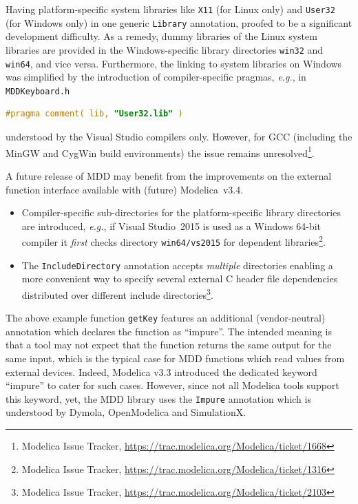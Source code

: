 \documentclass{resources/modelica}
\newcommand{\modelica}[1]{\lstinline[language=modelica]|#1|}
\begin{document}
Having platform-specific system libraries like \modelica{X11} (for Linux only) and \modelica{User32} (for Windows only) in one generic \modelica{Library} annotation, proofed to be a significant development difficulty. As a remedy, dummy libraries of the Linux system libraries are provided in the Windows-specific library directories \modelica{win32} and \modelica{win64}, and vice versa. Furthermore, the linking to system libraries on Windows was simplified by the introduction of compiler-specific pragmas, \textit{e.g.}, in \modelica{MDDKeyboard.h}
\begin{lstlisting}[language=C]
#pragma comment( lib, "User32.lib" )
\end{lstlisting}
understood by the Visual Studio compilers only. However, for GCC (including the MinGW and CygWin build environments) the issue remains unresolved\footnote{Modelica Issue Tracker, \url{https://trac.modelica.org/Modelica/ticket/1668}}.

A future release of MDD may benefit from the improvements on the external function interface available with (future) Modelica~v3.4.
\begin{itemize}
 \item Compiler-specific sub-directories for the platform-specific library directories are introduced, \textit{e.g.}, if Visual Studio~2015 is used as a Windows 64-bit compiler it \emph{first} checks directory \modelica{win64/vs2015} for dependent libraries\footnote{Modelica Issue Tracker, \url{https://trac.modelica.org/Modelica/ticket/1316}}.
 \item The \modelica{IncludeDirectory} annotation accepts \emph{multiple} directories enabling a more convenient way to specify several external C header file dependencies distributed over different include directories\footnote{Modelica Issue Tracker, \url{https://trac.modelica.org/Modelica/ticket/2103}}.
\end{itemize}

The above example function \modelica{getKey} features an additional (vendor-neutral) annotation which declares the function
as ``impure''. The intended meaning is that a tool may not expect that the
function returns the same output for the same input, which is the typical case
for MDD functions which read values from external devices. Indeed, Modelica v3.3 introduced the dedicated keyword
``impure'' to cater for such cases. However, since not all Modelica tools support this
keyword, yet, the MDD library uses the \modelica{Impure} annotation which is understood
by Dymola, OpenModelica and SimulationX.
\end{document}
